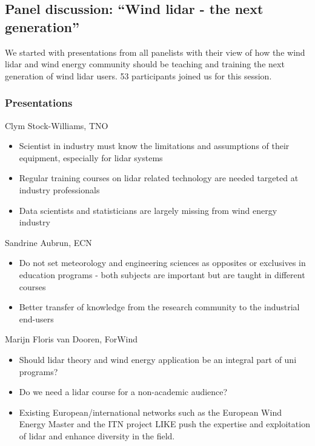 \subsection{Panel discussion: \enquote{Wind lidar - the next generation}}

We started with presentations from all panelists with their view of how the wind lidar and wind energy community should be teaching and training the next generation of wind lidar users. 53 participants joined us for this session.

\subsubsection{Presentations}

Clym Stock-Williams, TNO

\begin{itemize}
	\item Scientist in industry must know the limitations and assumptions of their equipment, especially for lidar systems
	\item Regular training courses on lidar related technology are needed targeted at industry professionals
	\item Data scientists and statisticians are largely missing from wind energy industry
\end{itemize}

Sandrine Aubrun, ECN

\begin{itemize}
	\item Do not set meteorology and engineering sciences as opposites or exclusives in education programs - both subjects are important but are taught in different courses
	\item Better transfer of knowledge from the research community to the industrial end-users
\end{itemize}

Marijn Floris van Dooren, ForWind

\begin{itemize}
	\item Should lidar theory and wind energy application be an integral part of uni programs?
	\item Do we need a lidar course for a non-academic audience?
	\item Existing European/international networks such as the European Wind Energy Master and the ITN project LIKE push the expertise and exploitation of lidar and enhance diversity in the field.
\end{itemize}

